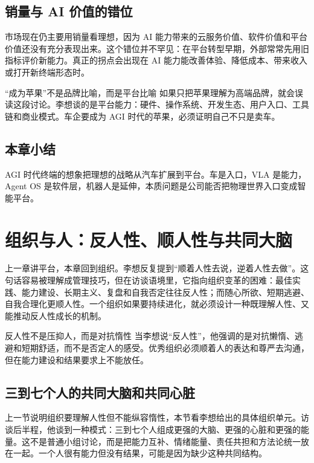 \documentclass[a4paper]{article}
\begin{document}
\subsection{销量与 AI 价值的错位}

市场现在仍主要用销量看理想，因为 AI 能力带来的云服务价值、软件价值和平台价值还没有充分表现出来。这个错位并不罕见：在平台转型早期，外部常常先用旧指标评价新能力。真正的拐点会出现在 AI 能力能改善体验、降低成本、带来收入或打开新终端形态时。

\begin{warningbox}{“成为苹果”不是品牌比喻，而是平台比喻}
如果只把苹果理解为高端品牌，就会误读这段讨论。李想谈的是平台能力：硬件、操作系统、开发生态、用户入口、工具链和商业模式。车企要成为 AGI 时代的苹果，必须证明自己不只是卖车。
\end{warningbox}

\subsection{本章小结}

AGI 时代终端的想象把理想的战略从汽车扩展到平台。车是入口，VLA 是能力，Agent OS 是软件层，机器人是延伸，本质问题是公司能否把物理世界入口变成智能平台。

\section{组织与人：反人性、顺人性与共同大脑}

上一章讲平台，本章回到组织。李想反复提到“顺着人性去说，逆着人性去做”。这句话容易被理解成管理技巧，但在访谈语境里，它指向组织变革的困难：最佳实践、能力建设、长期主义、复盘和自我否定往往反人性；而随心所欲、短期逃避、自我合理化更顺人性。一个组织如果要持续进化，就必须设计一种既理解人性、又能推动反人性成长的机制。

\begin{knowledgebox}{反人性不是压抑人，而是对抗惰性}
当李想说“反人性”，他强调的是对抗懒惰、逃避和短期舒适，而不是否定人的感受。优秀组织必须顺着人的表达和尊严去沟通，但在能力建设和结果要求上不能放任。
\end{knowledgebox}

\subsection{三到七个人的共同大脑和共同心脏}

上一节说明组织要理解人性但不能纵容惰性，本节看李想给出的具体组织单元。访谈后半程，他谈到一种模式：三到七个人组成更强的大脑、更强的心脏和更强的能量。这不是普通小组讨论，而是把能力互补、情绪能量、责任共担和方法论统一放在一起。一个人很有能力但没有结果，可能是因为缺少这种共同结构。
\end{document}
